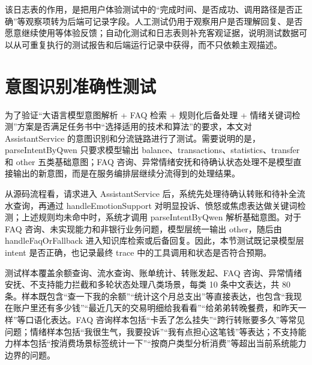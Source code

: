 \documentclass[bachelor, print]{xduthesis}
\begin{document}
该日志表的作用，是把用户体验测试中的“完成时间、是否成功、调用路径是否正确”等观察项转为后端可记录字段。人工测试仍用于观察用户是否理解回复、是否愿意继续使用等体验反馈；自动化测试和日志表则补充客观证据，说明测试数据可以从可重复执行的测试报告和后端运行记录中获得，而不只依赖主观描述。

\section{意图识别准确性测试}

为了验证“大语言模型意图解析 + FAQ 检索 + 规则化后备处理 + 情绪关键词检测”方案是否满足任务书中“选择适用的技术和算法”的要求，本文对 AssistantService 的意图识别和分流链路进行了测试。需要说明的是，parseIntentByQwen 只要求模型输出 balance、transactions、statistics、transfer 和 other 五类基础意图；FAQ 咨询、异常情绪安抚和待确认状态处理不是模型直接输出的新意图，而是在服务编排层继续分流得到的处理结果。

从源码流程看，请求进入 AssistantService 后，系统先处理待确认转账和待补全流水查询，再通过 handleEmotionSupport 对明显投诉、愤怒或焦虑表达做关键词检测；上述规则均未命中时，系统才调用 parseIntentByQwen 解析基础意图。对于 FAQ 咨询、未实现能力和非银行业务问题，模型层统一输出 other，随后由 handleFaqOrFallback 进入知识库检索或后备回复。因此，本节测试既记录模型层 intent 是否正确，也记录最终 trace 中的工具调用和状态是否符合预期。

测试样本覆盖余额查询、流水查询、账单统计、转账发起、FAQ 咨询、异常情绪安抚、不支持能力拦截和多轮状态处理八类场景，每类 10 条中文表达，共 80 条。样本既包含“查一下我的余额”“统计这个月总支出”等直接表达，也包含“我现在账户里还有多少钱”“最近几天的交易明细给我看看”“给弟弟转晚餐费，和昨天一样”等口语化表达。FAQ 咨询样本包括“卡丢了怎么挂失”“跨行转账要多久”等常见问题；情绪样本包括“我很生气，我要投诉”“我有点担心这笔钱”等表达；不支持能力样本包括“按消费场景标签统计一下”“按商户类型分析消费”等超出当前系统能力边界的问题。
\end{document}
